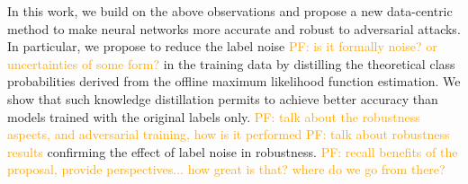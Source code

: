 \documentclass[conference]{IEEEtran}
\newcommand{\pf}[1]{{\textcolor{orange}{PF: {#1}}}}
\begin{document}
In this work, we build on the above observations and propose a new data-centric method to make neural networks more accurate and robust to adversarial attacks. In particular, we propose to reduce the label noise \pf{is it formally noise? or uncertainties of some form?} in the training data by distilling the theoretical class probabilities derived from the offline maximum likelihood function estimation. We show that such knowledge distillation permits to achieve better accuracy than models trained with the original labels only. \pf{talk about the robustness aspects, and adversarial training, how is it performed} \pf{talk about robustness results} confirming the effect of label noise in robustness. \pf{recall benefits of the proposal, provide perspectives... how great is that? where do we go from there?}




\end{document}
